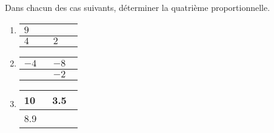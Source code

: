 \begin{exercice*}    
    Dans chacun des cas suivants, déterminer la quatrième proportionnelle.
    \begin{enumerate}
        \item {\renewcommand{\arraystretch}{1.2}
            \begin{tabular}{|>{\centering\arraybackslash}m{0.1\linewidth}|>{\centering\arraybackslash}m{0.1\linewidth}|}
                \hline
                $9$&{\bfseries\color{OrangeRed}$x$ ?}\\\hline
                $4$&$2$\\\hline
            \end{tabular}
        }\smallskip
        \item {\renewcommand{\arraystretch}{1.2}
            \begin{tabular}{|>{\centering\arraybackslash}m{0.1\linewidth}|>{\centering\arraybackslash}m{0.1\linewidth}|}
                \hline
                $-4$&$-8$\\\hline
                {\bfseries\color{OrangeRed}$t$ ?}&$-2$\\\hline            
            \end{tabular}
        }\smallskip
        \item {\renewcommand{\arraystretch}{1.2}
            \begin{tabular}{|>{\centering\arraybackslash}m{0.1\linewidth}|>{\centering\arraybackslash}m{0.1\linewidth}|}
                \hline                
                \num{10}&\num{3.5}\\\hline            
                \num{8.9}&{\bfseries\color{OrangeRed}$z$ ?}\\\hline
            \end{tabular}
        }
    \end{enumerate}
\end{exercice*}
